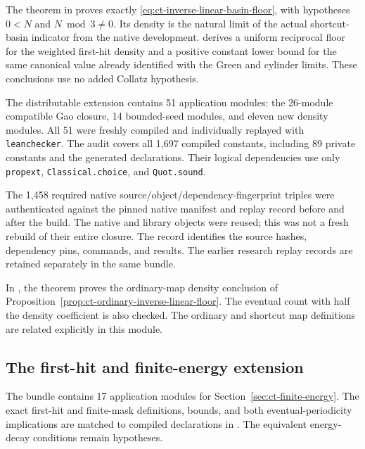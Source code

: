 \documentclass[11pt,a4paper]{article}
\begin{document}
The theorem
 in
 proves exactly
\eqref{eq:ct-inverse-linear-basin-floor}, with hypotheses
\(0<N\) and \(N\bmod3\ne0\). Its density is the natural limit of
the actual shortcut-basin indicator from the native development.
 derives a uniform
reciprocal floor for the weighted first-hit density and a positive
constant lower bound for the same canonical value already identified
with the Green and cylinder limits. These conclusions use no added
Collatz hypothesis.

The distributable extension contains 51 application modules: the
26-module compatible Gao closure, 14 bounded-seed modules, and eleven
new density modules. All 51 were freshly compiled and individually
replayed with \texttt{leanchecker}. The audit covers all 1,697 compiled
constants, including 89 private constants and the generated declarations.
Their logical dependencies use only \texttt{propext},
\texttt{Classical.choice}, and \texttt{Quot.sound}.

The 1,458 required native source/object/dependency-fingerprint triples
were authenticated against the pinned native manifest and replay record
before and after the build. The native and library objects were reused;
this was not a fresh rebuild of their entire closure. The record
 identifies the
source hashes, dependency pins, commands, and results. The earlier
research replay records are retained separately in the same bundle.

In , the theorem
proves the ordinary-map density conclusion of
Proposition~\ref{prop:ct-ordinary-inverse-linear-floor}. The eventual
count with half the density coefficient is also checked. The ordinary
and shortcut map definitions are related explicitly in this module.


\subsection{The first-hit and finite-energy extension}

The bundle  contains 17 application
modules for Section~\ref{sec:ct-finite-energy}. The exact first-hit
and finite-mask definitions, bounds, and both eventual-periodicity
implications are matched to compiled declarations in
. The equivalent energy-decay
conditions remain hypotheses.
\end{document}
